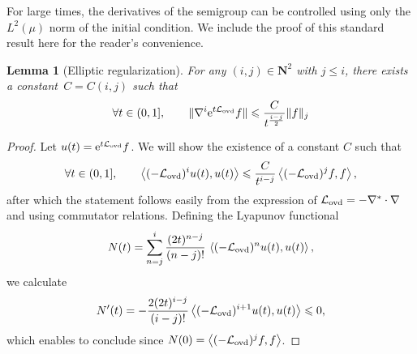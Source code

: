 \documentclass[11pt,a4paper]{article}
\newcommand{\e}{\mathrm{e}}
\newcommand{\nat}{\mathbf N}
\newcommand{\grad}{\nabla}
\theoremstyle{plain}
\newtheorem{lemma}{Lemma}[section]
\newtheorem{remark}{Remark}[section]
\numberwithin{equation}{section}
\renewcommand{\leq}{\leqslant}
\begin{document}

For large times,
the derivatives of the semigroup can be controlled using only the $L^2(\mu)$ norm of the initial condition.
We include the proof of this standard result here for the reader's convenience.
\begin{lemma}
    [Elliptic regularization]
    \label{lemma:elliptic_reg}
    For any $(i,j) \in \nat^2$ with $j \leq i$,
    there exists a constant~$C = C(i, j)$ such that
    \[
        \forall t \in (0, 1], \qquad
        \norm*{\grad^i \e^{t \mathcal L_{\rm ovd}} f} \leq \frac{C}{t^{\frac{i-j}{2}}} \norm*{f}[j]
    \]
\end{lemma}
\begin{proof}
    Let $u(t) = \e^{t \mathcal L_{\rm ovd}} f$.
    We will show the existence of a constant $C$ such that
    \[
        \forall t \in (0, 1], \qquad
        \ip{(-\mathcal L_{\rm ovd})^i u(t)}{u(t)}
        \leq \frac{C}{t^{i-j}} \ip{(-\mathcal L_{\rm ovd})^j f}{f},
    \]
    after which the statement follows easily from the expression of $\mathcal L_{\rm ovd} = - \grad^* \cdot \grad$ and using commutator relations.
    Defining the Lyapunov functional
    \[
        N(t) = \sum_{n=j}^{i} \frac{(2t)^{n-j}}{(n-j)!} \, \ip{(-\mathcal L_{\rm ovd})^n u(t)}{u(t)} ,
    \]
    we calculate
    \[
        N'(t) =  - \frac{2(2t)^{i-j}}{(i-j)!} \ip{(- \mathcal L_{\rm ovd})^{i+1} u(t)}{u(t)} \leq 0,
    \]
    which enables to conclude since $N(0) = \ip{(- \mathcal L_{\rm ovd})^j f}{f}$.
\end{proof}
\end{document}
